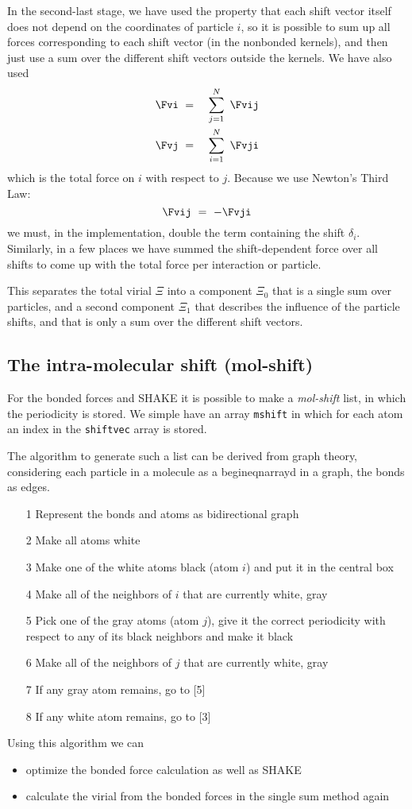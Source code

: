 In the second-last stage, we have used the property that each shift vector itself does not depend on the coordinates of particle $i$, so it is possible to sum
up all forces corresponding to each shift vector (in the nonbonded kernels), and then just use a sum over the different shift vectors outside the kernels.
We have also used
\begin{eqnarray}
\Fvi&~=~&\sum_{j=1}^N~\Fvij					\\
\Fvj&~=~&\sum_{i=1}^N~\Fvji
\end{eqnarray}
which is the total force on $i$ with respect to $j$. Because we use Newton's Third Law:
\begin{equation}
\Fvij~=~-\Fvji
\end{equation}
we must, in the implementation, double the term containing the shift $\delta_i$. Similarly, in a few places we have summed the shift-dependent force
over all shifts to come up with the total force per interaction or particle.

This separates the total virial $\Xi$ into a component $\Xi_0$ that is a single sum over particles, and a second component $\Xi_1$ that describes the influence of
the particle shifts, and that is only a sum over the different shift vectors.

\subsection{The intra-molecular shift (mol-shift)}
For the bonded forces and SHAKE it is possible to make a {\em mol-shift}
list, in which the periodicity is stored. We simple have an array {\tt mshift}
in which for each atom an index in the {\tt shiftvec} array is stored.

The algorithm to generate such a list can be derived from graph theory,
considering each particle in a molecule as a begin{eqnarray}d in a graph, the bonds 
as edges.
\begin{enumerate}
\item[1]	Represent the bonds and atoms as bidirectional graph
\item[2]	Make all atoms white
\item[3]	Make one of the white atoms black (atom $i$) and put it in the
		central box
\item[4]	Make all of the neighbors of $i$ that are currently 
		white, gray 
\item[5]	Pick one of the gray atoms (atom $j$), give it the
		correct periodicity with respect to any of 
		its black neighbors
		and make it black
\item[6]	Make all of the neighbors of $j$ that are currently 
		white, gray
\item[7]	If any gray atom remains, go to [5]
\item[8]	If any white atom remains, go to [3]
\end{enumerate}
Using this algorithm we can 
\begin{itemize}
\item	optimize the bonded force calculation as well as SHAKE 
\item	calculate the virial from the bonded forces
	in the single sum method again
\end{itemize}


